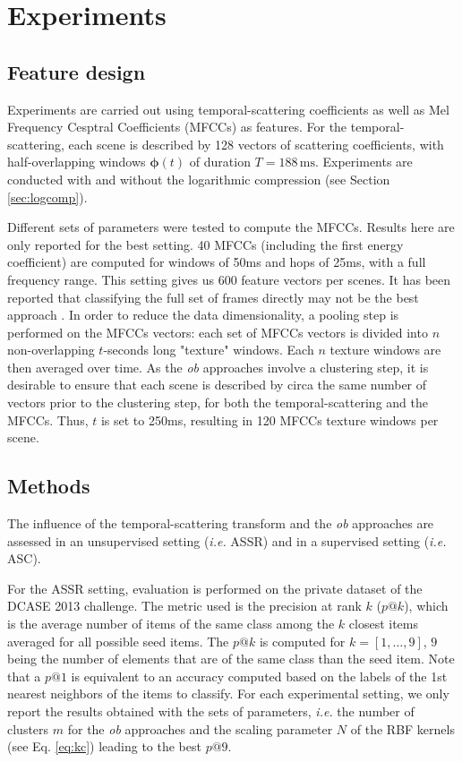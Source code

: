 \documentclass[journal]{IEEEtran}
\begin{document}
\section{Experiments}
\label{sec:experiments}

\subsection{Feature design}

Experiments are carried out using temporal-scattering coefficients as well as Mel Frequency Cesptral Coefficients (MFCCs) as features. For the temporal-scattering, each scene is described by 128 vectors of scattering coefficients, with half-overlapping windows $\boldsymbol{\phi}(t)$ of duration $T=188\,\mathrm{ms}$. Experiments are conducted with and without the logarithmic compression (see Section \ref{sec:logcomp}).

Different sets of parameters were tested to compute the MFCCs. Results here are only reported for the best setting. 40 MFCCs (including the first energy coefficient) are computed for windows of 50ms and hops of 25ms, with a full frequency range. This setting gives us 600 feature vectors per scenes. It has been reported that classifying the full set of frames directly may not be the best approach \cite{rakotomamonjy2015histogram}. In order to reduce the data dimensionality, a pooling step is performed on the MFCCs vectors: each set of MFCCs vectors is divided into $n$ non-overlapping $t$-seconds long "texture" windows. Each $n$ texture windows are then averaged over time. As the \emph{ob} approaches involve a clustering step, it is desirable to ensure that each scene is described by circa the same number of vectors prior to the clustering step, for both the temporal-scattering and the MFCCs. Thus, $t$ is set to 250ms, resulting in 120 MFCCs texture windows per scene. 

\subsection{Methods}

The influence of the temporal-scattering transform and the \emph{ob} approaches are assessed in an unsupervised setting (\emph{i.e.} ASSR) and in a supervised setting (\emph{i.e.} ASC). 

For the ASSR setting, evaluation is performed on the private dataset of the DCASE 2013 challenge. The metric used is the precision at rank $k$ ($p@k$), which is the  average  number  of  items  of  the  same  class among the $k$ closest items averaged for all possible seed items. The $p@k$ is computed for $k=[1,\ldots,9]$, $9$ being the number of elements that are of the same class than the seed item. Note that a $p@1$ is equivalent to an accuracy computed based on the labels of the 1st nearest neighbors of the items to classify. For each experimental setting, we only report the results obtained with the sets of parameters, \emph{i.e.} the number of clusters $m$ for the \emph{ob} approaches and the scaling parameter $N$ of the RBF kernels (see Eq. \ref{eq:kc}) leading to the best $p@9$.
 
\end{document}
